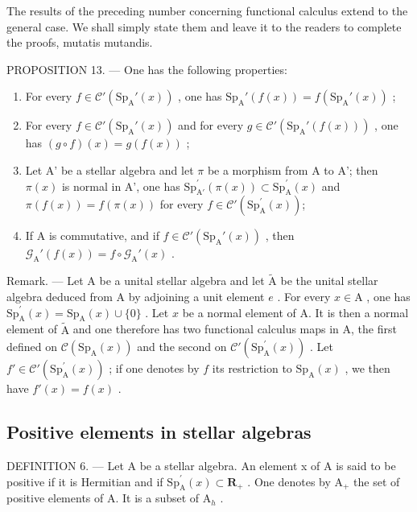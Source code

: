 The results of the preceding number concerning functional calculus extend to the general case. We shall simply state them and leave it to the readers to complete the proofs, mutatis mutandis.

PROPOSITION 13. --- One has the following properties:

\begin{enumerate}
\def\labelenumi{\alph{enumi})}
\item
  For every \(f \in \mathcal{C}'(\mathrm{Sp}_{\mathrm{A}}'(x))\) , one has \(\mathrm{Sp}_{\mathrm{A}}'(f(x)) = f(\mathrm{Sp}_{\mathrm{A}}'(x))\) ;
\item
  For every \(f \in \mathcal{C}'(\mathrm{Sp}_{\mathrm{A}}'(x))\) and for every \(g \in \mathcal{C}'(\mathrm{Sp}_{\mathrm{A}}'(f(x)))\) , one has \((g \circ f)(x) = g(f(x))\) ;
\item
  Let A' be a stellar algebra and let \(\pi\) be a morphism from A to A'; then \(\pi(x)\) is normal in A', one has \(\mathrm{Sp}_{\mathrm{A}'}^{\prime}(\pi(x)) \subset \mathrm{Sp}_{\mathrm{A}}^{\prime}(x)\) and \(\pi(f(x)) = f(\pi(x))\) for every \(f \in \mathcal{C}'(\mathrm{Sp}_{\mathrm{A}}^{\prime}(x))\);
\item
  If A is commutative, and if \(f \in \mathcal{C}'(\mathrm{Sp}_{\mathrm{A}}'(x))\) , then \(\mathcal{G}_{\mathrm{A}}'(f(x)) = f \circ \mathcal{G}_{\mathrm{A}}'(x)\) .
\end{enumerate}

Remark. --- Let A be a unital stellar algebra and let \(\widetilde{\mathrm{A}}\) be the unital stellar algebra deduced from A by adjoining a unit element \(e\) . For every \(x \in \mathrm{A}\) , one has \(\mathrm{Sp}_{\mathrm{A}}^{\prime}(x) = \mathrm{Sp}_{\mathrm{A}}(x) \cup \{0\}\) . Let \(x\) be a normal element of A. It is then a normal element of \(\widetilde{\mathrm{A}}\) and one therefore has two functional calculus maps in A, the first defined on \(\mathcal{C}(\mathrm{Sp}_{\mathrm{A}}(x))\) and the second on \(\mathcal{C}'(\mathrm{Sp}_{\mathrm{A}}^{\prime}(x))\) . Let \(f' \in \mathcal{C}'(\mathrm{Sp}_{\mathrm{A}}^{\prime}(x))\) ; if one denotes by \(f\) its restriction to \(\mathrm{Sp}_{\mathrm{A}}(x)\) , we then have \(f'(x) = f(x)\) .

\subsection{Positive elements in stellar algebras}

DEFINITION 6. --- Let A be a stellar algebra. An element x of A is said to be positive if it is Hermitian and if \(\mathrm{Sp}_{\mathrm{A}}^{\prime}(x) \subset \mathbf{R}_{+}\) . One denotes by \(\mathrm{A}_{+}\) the set of positive elements of A. It is a subset of \(\mathrm{A}_{h}\) .


